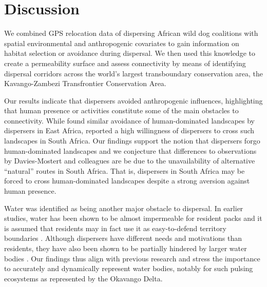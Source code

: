 \documentclass[abstract=on,10pt,a4paper,bibliography=totocnumbered]{scrartcl}
\begin{document}
\newpage
\section{Discussion}
We combined GPS relocation data of dispersing African wild dog coalitions with
spatial environmental and anthropogenic covariates to gain information on
habitat selection or avoidance during dispersal. We then used this knowledge to
create a permeability surface and assess connectivity by means of identifying
dispersal corridors across the world’s largest transboundary conservation area,
the Kavango-Zambezi Transfrontier Conservation Area.

Our results indicate that dispersers avoided anthropogenic influences,
highlighting that human presence or activities constitute some of the main
obstacles to connectivity. While \cite{Masenga.2016} found similar avoidance of
human-dominated landscapes by dispersers in East Africa,
\cite{DaviesMostert.2012} reported a high willingness of dispersers to cross
such landscapes in South Africa. Our findings support the notion that dispersers
forgo human-dominated landscapes and we conjecture that differences to
observations by Davies-Mostert and colleagues are be due to the unavailability
of alternative ``natural'' routes in South Africa. That is, dispersers in South
Africa may be forced to cross human-dominated landscapes despite a strong
aversion against human presence.

Water was identified as being another major obstacle to dispersal. In earlier
studies, water has been shown to be almost impermeable for resident packs and it
is assumed that residents may in fact use it as easy-to-defend territory
boundaries \citep{Cozzi.2013}. Although dispersers have different needs and
motivations than residents, they have also been shown to be partially hindered
by larger water bodies \citep{Abrahms.2017, Cozzi.2020}. Our findings thus align
with previous research and stress the importance to accurately and dynamically
represent water bodies, notably for such pulsing ecosystems as represented by
the Okavango Delta.
\end{document}
